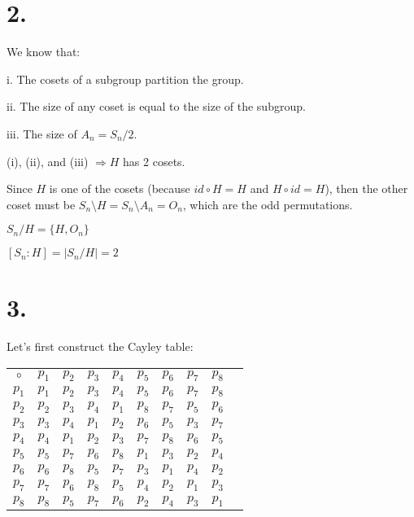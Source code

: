 \documentclass{article}
\begin{document}
\section*{2.}
We know that:

i. The cosets of a subgroup partition the group.

ii. The size of any coset is equal to the size of the subgroup.

iii. The size of $A_n = S_n/2$.
\newline

\noindent
(i), (ii), and (iii) $\Rightarrow H$ has 2 cosets.
\newline

\noindent
Since $H$ is one of the cosets (because $id \circ H =H$ and $H \circ id =H$), then the other coset must be $S_n \setminus H = S_n \setminus A_n = O_n$, which are the odd permutations.
\newline

\noindent
$S_n/H = \{H, O_n\}$

\noindent
$[S_n:H] = |S_n/H| = 2$

\section*{3.}

\noindent
Let's first construct the Cayley table:

\begin{tabular}{c | c c c c c c c c c}
  $\circ$ & $p_1$ & $p_2$ & $p_3$ & $p_4$ & $p_5$ & $p_6$ & $p_7$ & $p_8$ \\
  \cline{1-9}
  {$p_1$} & $p_1$ & $p_2$ & $p_3$ & $p_4$ & $p_5$ & $p_6$ & $p_7$ & $p_8$\\
  {$p_2$} & $p_2$ & $p_3$ & $p_4$ & $p_1$ & $p_8$ & $p_7$ & $p_5$ & $p_6$ \\
  {$p_3$} & $p_3$ & $p_4$ & $p_1$ & $p_2$ & $p_6$ & $p_5$ & $p_3$ & $p_7$ \\
  {$p_4$} & $p_4$ & $p_1$ & $p_2$ & $p_3$ & $p_7$ & $p_8$ & $p_6$ & $p_5$ \\
  {$p_5$} & $p_5$ & $p_7$ & $p_6$ & $p_8$ & $p_1$ & $p_3$ & $p_2$ & $p_4$ \\
  {$p_6$} & $p_6$ & $p_8$ & $p_5$ & $p_7$ & $p_3$ & $p_1$ & $p_4$ & $p_2$ \\
  {$p_7$} & $p_7$ & $p_6$ & $p_8$ & $p_5$ & $p_4$ & $p_2$ & $p_1$ & $p_3$ \\
  {$p_8$} & $p_8$ & $p_5$ & $p_7$ & $p_6$ & $p_2$ & $p_4$ & $p_3$ & $p_1$ \\
\end{tabular}
\newline
\newline
\end{document}
